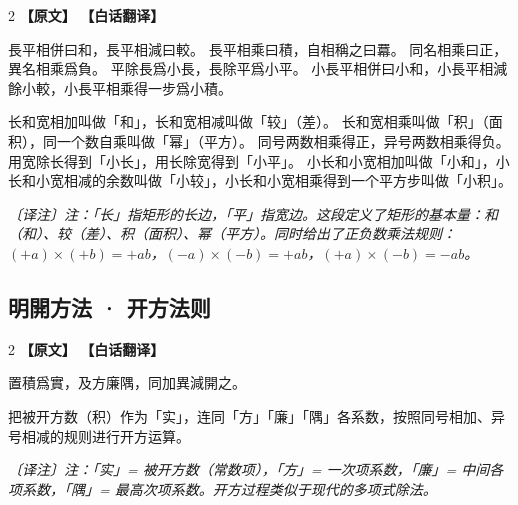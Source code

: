 \documentclass[11pt,a4paper]{article}
\newcommand{\noteMOD}[1]{\par\textcolor{notecolor}{\small\textit{〔译注〕#1}}\par\smallskip}
\begin{document}
\begin{paracol}{2}
\noindent\textbf{\textcolor{leftlabel}{【原文】}}
\switchcolumn
\noindent\textbf{\textcolor{rightlabel}{【白话翻译】}}
\switchcolumn*

長平相併曰和，長平相減曰較。\break
長平相乘曰積，自相稱之曰羃。\break
同名相乘曰正，異名相乘爲負。\break
平除長爲小長，長除平爲小平。\break
小長平相併曰小和，小長平相減餘小較，小長平相乘得一步爲小積。

\switchcolumn

长和宽相加叫做「和」，长和宽相减叫做「较」（差）。\break
长和宽相乘叫做「积」（面积），同一个数自乘叫做「幂」（平方）。\break
同号两数相乘得正，异号两数相乘得负。\break
用宽除长得到「小长」，用长除宽得到「小平」。\break
小长和小宽相加叫做「小和」，小长和小宽相减的余数叫做「小较」，小长和小宽相乘得到一个平方步叫做「小积」。

\noteMOD{注：「长」指矩形的长边，「平」指宽边。这段定义了矩形的基本量：和（和）、较（差）、积（面积）、幂（平方）。同时给出了正负数乘法规则：$(+a)\times(+b)=+ab$，$(-a)\times(-b)=+ab$，$(+a)\times(-b)=-ab$。}

\end{paracol}

\medskip

\subsection{明開方法 · 开方法则}

\begin{paracol}{2}
\noindent\textbf{\textcolor{leftlabel}{【原文】}}
\switchcolumn
\noindent\textbf{\textcolor{rightlabel}{【白话翻译】}}
\switchcolumn*

置積爲實，及方廉隅，同加異減開之。

\switchcolumn

把被开方数（积）作为「实」，连同「方」「廉」「隅」各系数，按照同号相加、异号相减的规则进行开方运算。

\noteMOD{注：「实」= 被开方数（常数项），「方」= 一次项系数，「廉」= 中间各项系数，「隅」= 最高次项系数。开方过程类似于现代的多项式除法。}

\end{paracol}

\newpage

\end{document}
